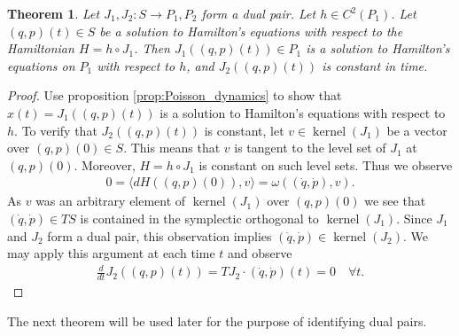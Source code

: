 \documentclass[12pt]{amsart}
\newtheorem{thm}{Theorem}[section]
\DeclareMathOperator{\kernel}{kernel}
\begin{document}
  \begin{thm} \label{thm:dual_pairs}
    Let $J_1,J_2:S \to P_1,P_2$ form a dual pair.
    Let $h \in C^2(P_1)$.
    Let $(q,p)(t) \in S$ be a solution to Hamilton's equations
    with respect to the Hamiltonian $H = h \circ J_1$.
    Then $J_1\left( (q,p)(t) \right) \in P_1$ is a solution
    to Hamilton's equations on $P_1$ with respect to $h$,
    and $J_2( (q,p)(t))$ is constant in time.
  \end{thm}
  \begin{proof}
    Use proposition \ref{prop:Poisson_dynamics} to show that
    $x(t) = J_1 ((q,p)(t))$ is a solution to Hamilton's equations
    with respect to $h$.
    To verify that $J_2( (q,p)(t) )$ is constant,
    let $v \in \kernel(J_1)$ be a vector over $(q,p)(0) \in S$.
    This means that $v$ is tangent to the level set of $J_1$ at $(q,p)(0)$.
    Moreover, $H = h \circ J_1$ is constant on such level sets.
    Thus we observe
    \begin{align*}
      0 = \langle dH((q,p)(0)) , v \rangle =
      \omega \left( (\dot{q},\dot{p}) , v \right).
    \end{align*}
    As $v$ was an arbitrary element of $\kernel(J_1)$ over $(q,p)(0)$
    we see that $(\dot{q},\dot{p}) \in TS$ is contained
    in the symplectic orthogonal to $\kernel(J_1)$.
    Since $J_1$ and $J_2$ form a dual pair,
    this observation implies $(\dot{q},\dot{p}) \in \kernel(J_2)$.
    We may apply this argument at each time $t$ and observe
    \begin{align*}
      \frac{d}{dt} J_2( (q,p)(t)) = TJ_2 \cdot (\dot{q},\dot{p})(t)  
      = 0 \quad \forall t.
    \end{align*}
  \end{proof}
  
  The next theorem will be used later for the purpose of identifying
  dual pairs.
  
\end{document}
